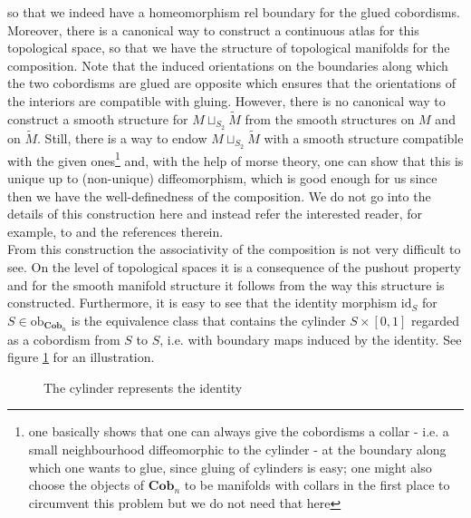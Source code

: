 so that we indeed have a homeomorphism rel boundary for the glued cobordisms.
\\
Moreover, there is a canonical way to construct a continuous atlas for this topological space, so that we have the structure of topological manifolds for the composition. Note that the induced orientations on the boundaries along which the two cobordisms are glued are opposite which ensures that the orientations of the interiors are compatible with gluing. However, there is no canonical way to construct a smooth structure for $M \sqcup_{S_{2}} \tilde{M}$ from the smooth structures on $M$ and on $\tilde{M}$. Still, there is a way to endow $M \sqcup_{S_{2}} \tilde{M}$ with a smooth structure compatible with the given ones\footnote{one basically shows that one can always give the cobordisms a collar - i.e. a small neighbourhood diffeomorphic to the cylinder - at the boundary along which one wants to glue, since gluing of cylinders is easy; one might also choose the objects of $\mathbf{Cob}_{n}$ to be manifolds with collars in the first place to circumvent this problem but we do not need that here} and, with the help of morse theory, one can show that this is unique up to (non-unique) diffeomorphism, which is good enough for us since then we have the well-definedness of the composition. We do not go into the details of this construction here and instead refer the interested reader, for example, to \cite{bf5195ee} and the references therein.
\\
From this construction the associativity of the composition is not very difficult to see. On the level of topological spaces it is a consequence of the pushout property and for the smooth manifold structure it follows from the way this structure is constructed. Furthermore, it is easy to see that the identity morphism $\mathrm{id}_{S}$ for $S \in \mathrm{ob}_{\mathbf{Cob}_{n}}$ is the equivalence class that contains the cylinder $S \times [0,1]$ regarded as a cobordism from $S$ to $S$, i.e. with boundary maps induced by the identity. See figure \ref{fig:cylinder} for an illustration.
\\
\begin{figure}[h!]
\centering
{}
\caption{The cylinder represents the identity}
\label{fig:cylinder}
\end{figure}
